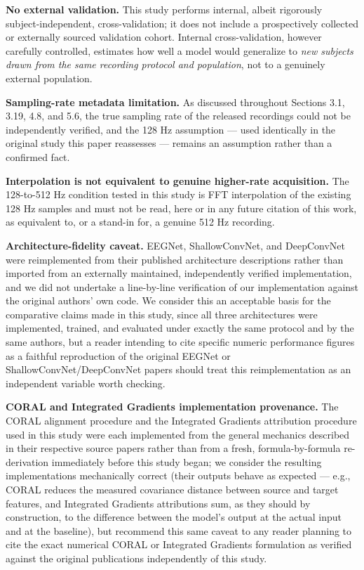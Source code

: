 \documentclass[a4paper,fleqn]{cas-sc}
\begin{document}
\textbf{No external validation.} This study performs internal, albeit rigorously subject-independent, cross-validation; it does not include a prospectively collected or externally sourced validation cohort. Internal cross-validation, however carefully controlled, estimates how well a model would generalize to \textit{new subjects drawn from the same recording protocol and population}, not to a genuinely external population.



\textbf{Sampling-rate metadata limitation.} As discussed throughout Sections 3.1, 3.19, 4.8, and 5.6, the true sampling rate of the released recordings could not be independently verified, and the 128 Hz assumption --- used identically in the original study this paper reassesses --- remains an assumption rather than a confirmed fact.



\textbf{Interpolation is not equivalent to genuine higher-rate acquisition.} The 128-to-512 Hz condition tested in this study is FFT interpolation of the existing 128 Hz samples and must not be read, here or in any future citation of this work, as equivalent to, or a stand-in for, a genuine 512 Hz recording.



\textbf{Architecture-fidelity caveat.} EEGNet, ShallowConvNet, and DeepConvNet were reimplemented from their published architecture descriptions \cite{lawhern2018eegnet,schirrmeister2017deep} rather than imported from an externally maintained, independently verified implementation, and we did not undertake a line-by-line verification of our implementation against the original authors' own code. We consider this an acceptable basis for the comparative claims made in this study, since all three architectures were implemented, trained, and evaluated under exactly the same protocol and by the same authors, but a reader intending to cite specific numeric performance figures as a faithful reproduction of the original EEGNet or ShallowConvNet/DeepConvNet papers should treat this reimplementation as an independent variable worth checking.



\textbf{CORAL and Integrated Gradients implementation provenance.} The CORAL alignment procedure and the Integrated Gradients attribution procedure used in this study were each implemented from the general mechanics described in their respective source papers \cite{sun2016return,sundararajan2017axiomatic} rather than from a fresh, formula-by-formula re-derivation immediately before this study began; we consider the resulting implementations mechanically correct (their outputs behave as expected --- e.g., CORAL reduces the measured covariance distance between source and target features, and Integrated Gradients attributions sum, as they should by construction, to the difference between the model's output at the actual input and at the baseline), but recommend this same caveat to any reader planning to cite the exact numerical CORAL or Integrated Gradients formulation as verified against the original publications independently of this study.
\end{document}
